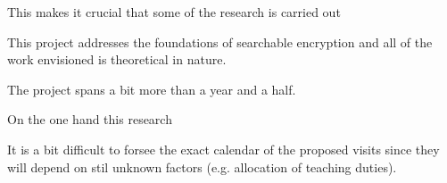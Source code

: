 \documentclass[11pt]{scrartcl}
\begin{document}
This makes it crucial that some of the research is carried out 

This project addresses the foundations of searchable encryption and all of the work envisioned is theoretical in nature.   

The project spans a bit more than a year and a half. 






On the one hand this research 


It is a bit difficult to forsee the exact calendar of the proposed visits since they will depend on stil unknown factors (e.g. allocation of teaching duties). 
\end{document}
